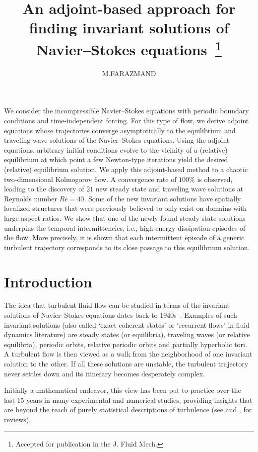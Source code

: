 \documentclass{jfm}
\title[Invariant solutions of the Navier--Stokes equation]
      {An adjoint-based approach for finding invariant
       solutions of Navier--Stokes equations~\footnote{Accepted for publication in the J. Fluid Mech.}}
\author[
M. FARAZMAND
        ]
{
M.\ns F\ls A\ls R\ls A\ls Z\ls M\ls A\ls N\ls D
}
\affiliation{
 Center for Nonlinear Science,
 School of Physics,
 Georgia Institute of Technology,
 Atlanta, GA  30332, USA
}
\begin{document}
\maketitle

We consider the incompressible Navier--Stokes equations with periodic boundary conditions and
time-independent forcing. For this type of flow, we derive adjoint equations whose
trajectories
converge asymptotically to the equilibrium and traveling wave solutions
of the Navier--Stokes equations. Using the adjoint equations,
arbitrary initial conditions evolve
to the vicinity of a (relative) equilibrium at which point a few
Newton-type iterations yield the desired (relative) equilibrium solution. We apply this
adjoint-based method
to a chaotic two-dimensional Kolmogorov flow. A convergence rate of $100\%$ is observed,
leading to the discovery
of $21$ new steady state and traveling wave solutions at Reynolds number $Re=40$.
Some of the new invariant solutions have spatially localized structures
that were previously believed to only exist on domains with large aspect ratios.
We show that one of the newly found
steady state solutions underpins the temporal intermittencies, i.e., high energy
dissipation episodes
of the flow. More precisely, it is shown that each intermittent episode of a generic turbulent
trajectory
corresponds to its close passage to this equilibrium solution.

\section{Introduction}\label{s:intro}
The idea that turbulent fluid flow can be studied in terms of
the invariant solutions of Navier--Stokes equations dates back to
1940s~\citep{hopf48}. Examples of such invariant solutions (also called
`exact coherent states' or `recurrent flows' in fluid dynamics
literature) are
steady states (or equilibria), traveling waves
(or relative equilibria), periodic orbits, relative periodic orbits and
partially hyperbolic tori.
A turbulent flow is then viewed as a walk from the neighborhood of
one invariant solution to the other. If all these solutions are unstable,
the turbulent trajectory never settles down and its itinerary becomes
desperately complex.

Initially a mathematical endeavor, this view has been put to practice over the last
15 years in many experimental and numerical studies, providing insights
that are beyond the reach of purely statistical descriptions of turbulence
(see  and , for reviews). %
\end{document}
